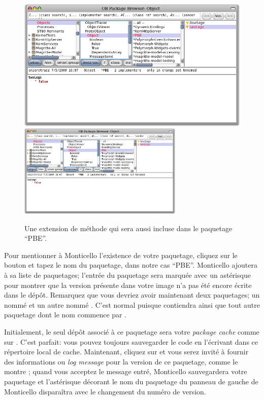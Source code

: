 \documentclass[a4paper,10pt,twoside]{book}
\begin{document}
\begin{figure}[btp]
	\begin{center}
	\ifluluelse
		{\includegraphics[width=\textwidth]{MCnewmethod}}
		{\includegraphics[width=0.7\textwidth]{MCnewmethod}}
	\end{center}
	\caption{Une extension de méthode qui sera aussi incluse dans le paquetage ``PBE''.}
\end{figure}

Pour mentionner à Monticello l'existence de votre paquetage, 
cliquez sur le bouton  et tapez le nom du paquetage,
dans notre cas ``PBE''.
Monticello ajoutera  à sa liste de paquetages;
l'entrée du paquetage sera marquée avec un astérisque pour
montrer que la version présente dans votre image n'a pas
été encore écrite dans le dépôt.
Remarquez que vous devriez avoir maintenant deux paquetages;
un nommé  et un autre nommé . C'est
normal puisque  contiendra  ainsi que
tout autre paquetage dont le nom commence par . %

Initialement, le seul dépôt associé à ce paquetage sera votre
\emph{package cache} comme sur .
C'est parfait: vous pouvez toujours sauvegarder le code en l'écrivant
dans ce répertoire local de cache.
Maintenant, cliquez sur  et vous serez invité à
fournir des informations ou \emph{log message} pour la version de ce 
paquetage, comme le montre ; 
quand vous acceptez le message entré, Monticello sauvegardera votre paquetage
et l'astérisque décorant le nom du paquetage du panneau de gauche
de Monticello disparaîtra avec le changement du numéro de version.
\end{document}

